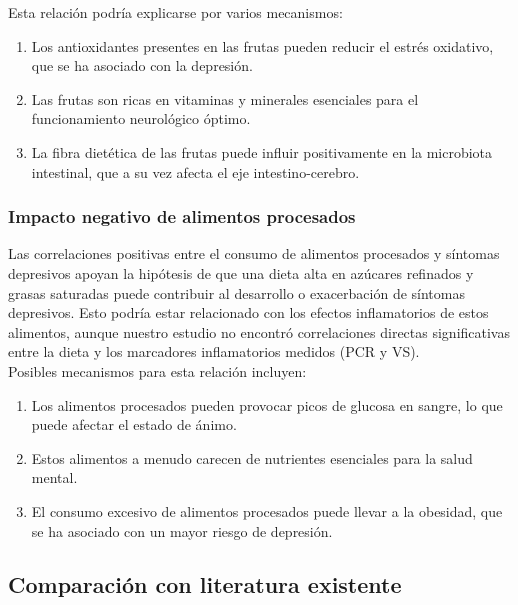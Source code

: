 \documentclass[jou]{apa7}
\begin{document}
	Esta relación podría explicarse por varios mecanismos:

	\begin{enumerate}
		\item Los antioxidantes presentes en las frutas pueden reducir el estrés
		oxidativo, que se ha asociado con la depresión.\\

		\item Las frutas son ricas en vitaminas y minerales esenciales para el
		funcionamiento neurológico óptimo.\\

		\item La fibra dietética de las frutas puede influir positivamente en la
		microbiota intestinal, que a su vez afecta el eje intestino-cerebro.
	\end{enumerate}

	\subsubsection{Impacto negativo de alimentos procesados}\label{impacto-negativo-de-alimentos-procesados}

	Las correlaciones positivas entre el consumo de alimentos procesados y
	síntomas depresivos apoyan la hipótesis de que una dieta alta en
	azúcares refinados y grasas saturadas puede contribuir al desarrollo o
	exacerbación de síntomas depresivos. Esto podría estar relacionado con
	los efectos inflamatorios de estos alimentos, aunque nuestro estudio no
	encontró correlaciones directas significativas entre la dieta y los
	marcadores inflamatorios medidos (PCR y VS).\\

	Posibles mecanismos para esta relación incluyen:

	\begin{enumerate}
		\item Los alimentos procesados pueden provocar picos de glucosa en sangre, lo que puede afectar el estado de ánimo.
		\item Estos alimentos a menudo carecen de nutrientes esenciales para la salud mental.
		\item El consumo excesivo de alimentos procesados puede llevar a la obesidad, que se ha asociado con un mayor riesgo de depresión.
	\end{enumerate}


	\subsection{Comparación con literatura existente}\label{comparaciuxf3n-con-literatura-existente}
\end{document}
